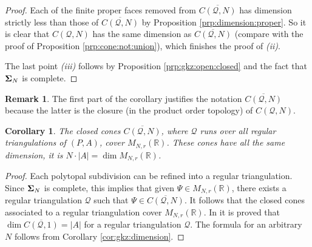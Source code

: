 \documentclass[12pt, a4article]{amsart}   	%
\numberwithin{equation}{section}
\theoremstyle{plain}
\newtheorem{corollary}[theorem]{Corollary}
\theoremstyle{definition}
\newtheorem{remark}[theorem]{Remark}
\newcommand{\R}{{\mathbb R}}
\newcommand{\bfSigma}{{\bf \Sigma}}
\newcommand{\mcQ}{{\mathcal Q}}
\newcommand{\MNaR}{M_{N,r}(\R)}
\begin{document}
\begin{proof}

 
Each of the finite proper faces removed from $\overline{C(\mcQ,N)}$ has dimension strictly less than those of $\overline{C(\mcQ,N)}$ by Proposition \ref{prp:dimension:proper}. So it is clear that $C(\mcQ,N)$ has the same dimension as $\overline{C(\mcQ,N)}$ (compare with the proof of Proposition \ref{prp:cone:not:union}), which finishes the proof of \emph{(ii)}.

The last point \emph{(iii)} follows by Proposition \ref{prp:gkz:open:closed} and the fact that $\bfSigma_N$ is complete.
\end{proof}

\begin{remark}\rm
The first part of the corollary justifies the notation $\overline{C(\mcQ,N)}$ because the latter is the closure (in the product order topology) of ${C(\mcQ,N)}$.
\end{remark}

\begin{corollary}\label{cor:gkz:triangulation}
The closed cones $\overline{C(\mcQ,N)}$, where $\mcQ$ runs over all regular triangulations of $(P,A)$, cover $\MNaR$. These cones have all the same dimension, it is $N \cdot|A| = \dim\MNaR$.
\end{corollary}

\begin{proof}
Each polytopal subdivision can be refined into a regular triangulation. Since $\bfSigma_N$ is complete, this implies that given $\Psi\in \MNaR$, there exists a regular triangulation $\mcQ$ such that $\Psi\in \overline{C(\mcQ,N)}$. It follows that the closed cones associated to a regular triangulation cover $\MNaR$.
In \cite[Chapter 7, Corollary 2.6]{GKZ} it is proved that $\dim\overline{C(\mcQ,1)} = |A|$ for a regular triangulation $\mcQ$. The formula for an arbitrary $N$ follows from Corollary \ref{cor:gkz:dimension}.
\end{proof}
\end{document}

